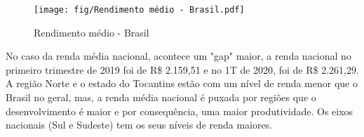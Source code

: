 \begin{figure}[h]
	\caption{Rendimento médio - Brasil}
	\texttt{[image: fig/Rendimento médio - Brasil.pdf]}
\end{figure}

\par No caso da renda média nacional, acontece um "gap" maior, a renda nacional no primeiro trimestre de 2019 foi de R\$ 2.159,51 e no 1T de 2020, foi de R\$ 2.261,29. A região Norte e o estado do Tocantins estão com um nível de renda menor que o Brasil no geral, mas, a renda média nacional é puxada por regiões que o desenvolvimento é maior e por consequência, uma maior produtividade. Os eixos nacionais (Sul e Sudeste) tem os seus níveis de renda maiores.
